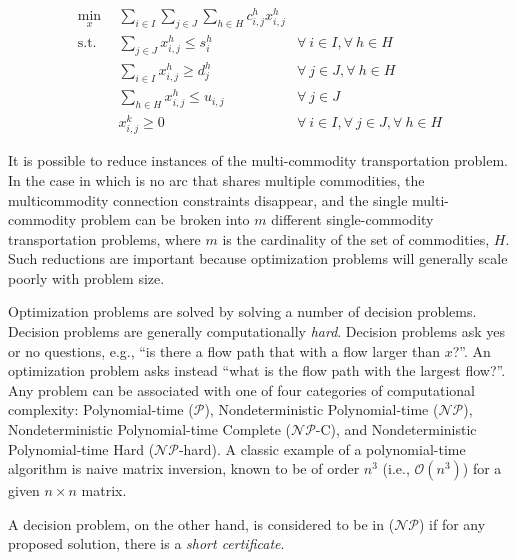 \begin{subequations}\label{eqs:MCTP}
  \begin{align}
    \min_{x} \:\: & 
    \sum_{i \in I}\sum_{j \in J}\sum_{h \in H} c_{i,j}^{h} x_{i,j}^{h}
    & \label{eqs:MCTP_obj} \\
    \text{s.t.} \:\: &
    \sum_{j \in J} x_{i,j}^{h} \leq s_{i}^{h}
    &
    \forall \: i \in I, \forall \: h \in H \label{eqs:MCTP_sup} \\
    &
    \sum_{i \in I} x_{i,j}^{h} \geq d_{j}^{h}
    & 
    \forall \: j \in J, \forall \: h \in H \label{eqs:MCTP_dem} \\
    &
    \sum_{h \in H} x_{i,j}^{h} \leq u_{i,j}
    & 
    \forall \: j \in J \label{eqs:MCTP_cap} \\
    &
    x_{i,j}^{k} \geq 0
    &
    \forall \: i \in I, \forall \: j \in J, \forall \: h \in H \label{eqs:MCTP_x}
  \end{align}
\end{subequations}

It is possible to reduce instances of the multi-commodity transportation
problem. In the case in which is no arc that shares multiple commodities, the
multicommodity connection constraints disappear, and the single multi-commodity
problem can be broken into $m$ different single-commodity transportation
problems, where $m$ is the cardinality of the set of commodities, $H$. Such
reductions are important because optimization problems will generally scale
poorly with problem size.

Optimization problems are solved by solving a number of decision
problems. Decision problems are generally computationally
\textit{hard}. Decision problems ask yes or no questions, e.g., ``is there a
flow path that with a flow larger than $x$?''. An optimization problem asks
instead ``what is the flow path with the largest flow?''. Any problem can be
associated with one of four categories of computational complexity:
Polynomial-time ($\mathcal{P}$), Nondeterministic Polynomial-time
($\mathcal{NP}$), Nondeterministic Polynomial-time Complete ($\mathcal{NP}$-C),
and Nondeterministic Polynomial-time Hard ($\mathcal{NP}$-hard). A classic
example of a polynomial-time algorithm is naive matrix inversion, known to be of
order $n^3$ (i.e., $\mathcal{O}(n^3)$) for a given $n \times n$ matrix.

A decision problem, on the other hand, is considered to be in ($\mathcal{NP}$)
if for any proposed solution, there is a \textit{short certificate}.

